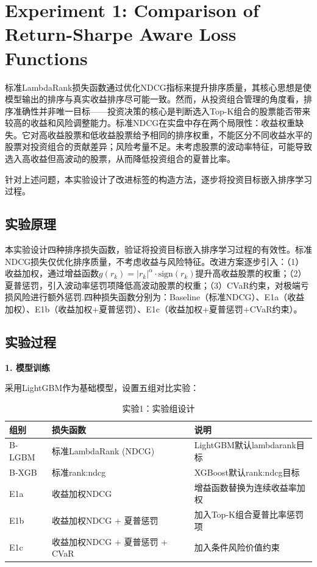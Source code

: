 \documentclass[11pt,a4paper]{ctexart}
\begin{document}

\section{Experiment 1: Comparison of Return-Sharpe Aware Loss Functions}

标准LambdaRank损失函数通过优化NDCG指标来提升排序质量，其核心思想是使模型输出的排序与真实收益排序尽可能一致。然而，从投资组合管理的角度看，排序准确性并非唯一目标——投资决策的核心是判断选入Top-K组合的股票能否带来较高的收益和风险调整能力。标准NDCG在实盘中存在两个局限性：收益权重缺失。它对高收益股票和低收益股票给予相同的排序权重，不能区分不同收益水平的股票对投资组合的贡献差异；风险考量不足。未考虑股票的波动率特征，可能导致选入高收益但高波动的股票，从而降低投资组合的夏普比率。

针对上述问题，本实验设计了改进标签的构造方法，逐步将投资目标嵌入排序学习过程。

\subsection{实验原理}
本实验设计四种排序损失函数，验证将投资目标嵌入排序学习过程的有效性。标准NDCG损失仅优化排序质量，不考虑收益与风险特征。改进方案逐步引入：（1）收益加权，通过增益函数$g(r_k) = |r_k|^{\alpha} \cdot \text{sign}(r_k)$提升高收益股票的权重；（2）夏普惩罚，引入波动率惩罚项降低高波动股票的权重；（3）CVaR约束，对极端亏损风险进行额外惩罚.四种损失函数分别为：Baseline（标准NDCG）、E1a（收益加权）、E1b（收益加权+夏普惩罚）、E1c（收益加权+夏普惩罚+CVaR约束）。


\subsection{实验过程}

\textbf{1. 模型训练}

采用LightGBM作为基础模型，设置五组对比实验：

\begin{table}[htbp]
\centering
\caption{实验1：实验组设计}
\label{tab:exp1-groups}
\begin{tabular}{lll}
\toprule
\textbf{组别} & \textbf{损失函数} & \textbf{说明} \\
\midrule
B-LGBM & 标准LambdaRank (NDCG) & LightGBM默认lambdarank目标 \\
B-XGB  & 标准rank:ndcg & XGBoost默认rank:ndcg目标 \\
E1a    & 收益加权NDCG & 增益函数替换为连续收益率加权 \\
E1b    & 收益加权NDCG + 夏普惩罚 & 加入Top-K组合夏普比率惩罚项 \\
E1c    & 收益加权NDCG + 夏普惩罚 + CVaR & 加入条件风险价值约束 \\
\bottomrule
\end{tabular}
\end{table}
\end{document}
